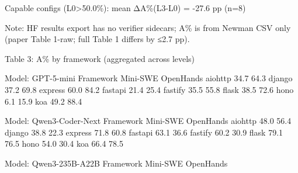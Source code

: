 Capable configs (L0>50.0\%): mean ΔA\%(L3-L0) = -27.6 pp (n=8)

Note: HF results export has no verifier sidecars; A\% is from Newman CSV only (paper Table 1-raw; full Table 1 differs by ≤2.7 pp).

Table 3: A\% by framework (aggregated across levels)

Model: GPT-5-mini
Framework      Mini-SWE  OpenHands
aiohttp            34.7       64.3
django             37.2       69.8
express            60.0       84.2
fastapi            21.4       25.4
fastify            35.5       55.8
flask              38.5       72.6
hono                6.1       15.9
koa                49.2       88.4

Model: Qwen3-Coder-Next
Framework      Mini-SWE  OpenHands
aiohttp            48.0       56.4
django             38.8       22.3
express            71.8       60.8
fastapi            63.1       36.6
fastify            60.2       30.9
flask              79.1       76.5
hono               54.0       30.4
koa                66.4       78.5

Model: Qwen3-235B-A22B
Framework      Mini-SWE  OpenHands